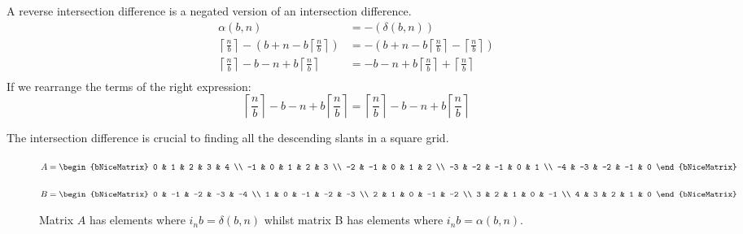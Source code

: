 \documentclass[letterpaper, twoside,12pt]{article}
\begin{document}
    A reverse intersection difference is a negated version of an intersection difference.
    \begin{equation}
        \begin{split}
            \alpha(b,n) &= -(\delta(b,n))\\
            \left\lceil \frac{n}{b} \right\rceil - (b + n - b\left\lceil \frac{n}{b} \right\rceil) &= - ( b + n - b\left\lceil \frac{n}{b} \right\rceil - \left\lceil \frac{n}{b} \right\rceil)\\
            \left\lceil \frac{n}{b} \right\rceil - b - n + b\left\lceil \frac{n}{b} \right\rceil &= - b - n + b\left\lceil \frac{n}{b} \right\rceil + \left\lceil \frac{n}{b} \right\rceil\\
        \end{split}
    \end{equation}
    If we rearrange the terms of the right expression:
    \begin{equation*}
        \left\lceil \frac{n}{b} \right\rceil - b - n + b\left\lceil \frac{n}{b} \right\rceil = \left\lceil \frac{n}{b} \right\rceil - b - n + b\left\lceil \frac{n}{b} \right\rceil
    \end{equation*}

    The intersection difference is crucial to finding all the descending slants in a square grid.

    \begin{figure}[ht]
        \centering
        \begin{minipage}{0.45\textwidth}
            \centering
            {$
            A =
            \begin{bNiceMatrix}
                0 & 1 & 2 & 3 & 4 \\
                -1 & 0 & 1 & 2 & 3 \\
                -2 & -1 & 0 & 1 & 2 \\
                -3 & -2 & -1 & 0 & 1 \\
                -4 & -3 & -2 & -1 & 0
            \end{bNiceMatrix}
            $}
        \end{minipage}
        \hfill
        \begin{minipage}{0.45\textwidth}
            \centering
            {$
            B =
            \begin{bNiceMatrix}
                0 & -1 & -2 & -3 & -4 \\
                1 & 0 & -1 & -2 & -3 \\
                2 & 1 & 0 & -1 & -2 \\
                3 & 2 & 1 & 0 & -1 \\
                4 & 3 & 2 & 1 & 0
            \end{bNiceMatrix}
            $}
        \end{minipage}
        \caption{Matrix $A$ has elements where $i_{n}b = \delta(b,n)$ whilst matrix B has elements where $i_{n}b = \alpha(b,n)$.}
    \end{figure}
\end{document}

